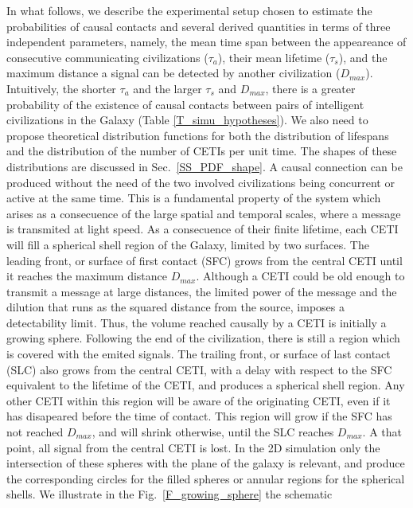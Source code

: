 \documentclass[crop]{CSLB}%
\begin{document}
In what follows, we describe the experimental setup chosen to estimate
the probabilities of causal contacts and several derived quantities in
terms of three independent parameters, namely, the mean time span
between the appeareance of consecutive communicating civilizations
($\tau_a$), their mean lifetime ($\tau_s$), and the maximum distance a
signal can be detected by another civilization ($D_{max}$).
%
Intuitively, the shorter $\tau_a$ and the larger $\tau_s$ and
$D_{max}$, there is a greater probability of the existence of causal
contacts between pairs of intelligent civilizations in the Galaxy
(Table \ref{T_simu_hypotheses}).
%
We also need to propose theoretical distribution functions for both the
distribution of lifespans and the distribution of the number of CETIs
per unit time.
%
The shapes of these distributions are discussed in Sec.~\ref{SS_PDF_shape}.
%
A causal connection can be produced without the need of the two
involved civilizations being concurrent or active at the same time.
%
This is a fundamental property of the system which arises as a
consecuence of the large spatial and temporal scales, where a message
is transmited at light speed.
%
As a consecuence of their finite lifetime,
each CETI will fill a spherical shell region of the Galaxy, limited by two
surfaces.
%
The leading front, or surface of first contact (SFC) grows from the
central CETI until it reaches the maximum distance $D_{max}$.
%
Although a CETI could be old enough to transmit a message at large
distances, the limited power of the message and the dilution that runs
as the squared distance from the source, imposes a
detectability limit.
%
Thus, the volume reached causally by a CETI is initially a growing
sphere.
%
Following the end of the civilization, there is still a region which
is covered with the emited signals.
%
The trailing front, or surface of last contact (SLC) also grows from
the central CETI, with a delay with respect to the SFC equivalent to
the lifetime of the CETI, and produces a spherical shell region.
%
Any other CETI within this region will be aware of the originating CETI,
even if it has disapeared before the time of contact.
%
This region will grow if the SFC has not reached $D_{max}$, and
will shrink otherwise, until the SLC reaches $D_{max}$.
%
A that point, all signal from the central CETI is lost.
%
In the 2D simulation only the intersection of these spheres with the
plane of the galaxy is relevant, and produce the corresponding
circles for the filled spheres or annular regions for the spherical
shells.
%
We illustrate in the Fig.~\ref{F_growing_sphere} the schematic
\end{document}
